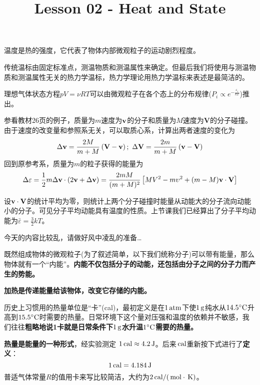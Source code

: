 \documentclass[CJK]{beamer}
\title{Lesson 02 - Heat and State}
\author{}
\date{}
\begin{document}

\begin{frame}
\bch
\bitem
\item{温度是热的强度，它代表了物体内部微观粒子的运动剧烈程度。}
\item{传统温标由固定标准点，测温物质和测温属性来确定。但最后我们将使用与测温物质和测温属性无关的热力学温标，热力学理论用热力学温标来表述是最简洁的。}
\item{理想气体状态方程$pV = \nu RT$可以由微观粒子在各个态上的分布规律($P_i\propto e^{-\frac{\varepsilon_i}{kT}}$)推出。}
\eitem

\ech
\end{frame}


\begin{frame}
\bch
{\small
参看教材26页的例子，质量为$m$速度为${\mathbf{v}}$的分子和质量为$M$速度为$\mathbf{V}$的分子碰撞。由于速度的改变量和参照系无关，可以取质心系，计算出两者速度的变化为
$$\Delta {\mathbf{v}} = \frac{2M}{m+M}\left(\mathbf{V}-{\mathbf{v}}\right);\ \Delta \mathbf{V} = \frac{2m}{m+M}\left({\mathbf{v}}-\mathbf{V}\right)$$
回到原参考系，质量为$m$的粒子获得的能量为
$$\Delta\varepsilon = \frac{1}{2}m\Delta{\mathbf{v}}\cdot(2{\mathbf{v}} + \Delta{\mathbf{v}}) = \frac{2mM}{(m+M)^2}\left[MV^2-m\upsilon^2 +(m-M){\mathbf{v}}\cdot\mathbf{V}\right]$$


\skipline

设${\mathbf{v}}\cdot\mathbf{V}$的统计平均为零，则统计上两个分子碰撞时能量从动能大的分子流向动能小的分子。可见分子平均动能具有温度的性质。上节课我们已经算出了分子平均动能为$\bar{\varepsilon} = \frac{3}{2}kT$。
}
\ech
\end{frame}


\begin{frame}
\bch
今天的内容比较乱，请做好风中凌乱的准备…
\ech
\end{frame}

\begin{frame}
\bch
\bitem
\item{既然组成物体的微观粒子(为了叙述简单，以下我们统称分子)可以带有能量，那么物体就有一个“内能”。{\bf 内能不仅包括分子的动能，还包括由分子之间的分子力而产生的势能。}}
\item{\bf 加热是传递能量给该物体，改变它存储的内能。}
\item{历史上习惯用的热量单位是“卡”(cal)，最初定义是在$1\,\mathrm{atm}$下使$1\,\mathrm{g}$纯水从$14.5^\circ \mathrm{C}$升高到$15.5^\circ \mathrm{C}$时需要的热量。日常环境下这个量对压强和温度的依赖并不敏感，我们往往{\bf 粗略地说1卡就是日常条件下$1\,\mathrm{g}$水升温$1^\circ \mathrm{C}$需要的热量。}}
\item{{\bf 热量是能量的一种形式}，经实验测定 $1\,\mathrm{cal} \approx 4.2\,\mathrm{J}$。后来$\,\mathrm{cal}$重新按下式进行了{\bf 定义}：
$$1\,\mathrm{cal} = 4.184 \,\mathrm{J}$$
普适气体常量$R$的值用卡来写比较简洁，大约为$2\,\mathrm{cal}/(\,\mathrm{mol}\cdot\,\mathrm{K})$。}
\eitem

\ech
\end{frame}
\end{document}
